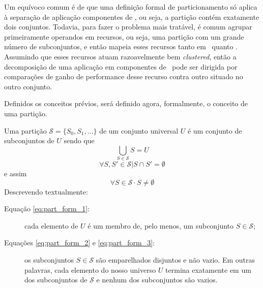          Um equívoco comum é de que uma definição formal de particionamento só aplica à separação de aplicação componentes de \hs, ou seja, a partição contém exatamente dois conjuntos.
         Todavia, para fazer o problema mais tratável, é comum agrupar primeiramente operandos em recursos, ou seja, uma partição com um grande número de subconjuntos, e então mapeia esses recursos tanto em \hardware\ quanto \software.
         Assumindo que esses recursos atuam razoavelmente bem \textit{clustered}, então a decomposição de uma aplicação em componentes de \hs\ pode ser dirigida por comparações de ganho de performance desse recurso contra outro situado no outro conjunto.

         Definidos os conceitos prévios, será definido agora, formalmente, o conceito de uma partição.

         Uma partição $ \mathcal{S} = \{S_0, S_1, \dots\} $ de um conjunto universal $ U $ é um conjunto de subconjuntos de $ U $ sendo que
         \begin{equation}
            \bigcup_{S \in \mathcal{S}} S = U \label{eq:part_form_1}
         \end{equation}
         \begin{equation}
            \forall S, S' \in \mathcal{S} | S \cap S' = \emptyset \label{eq:part_form_2}
         \end{equation}
         e assim
         \begin{equation}
            \forall S \in \mathcal{S} \cdot S \neq \emptyset \label{eq:part_form_3}
         \end{equation}
         Descrevendo textualmente:
         \begin{description}
            \item [Equação \ref{eq:part_form_1}:] cada elemento de $ U $ é um membro de, pelo menos, um subconjunto $ S \in \mathcal{S} $;        

            \item [Equações \ref{eq:part_form_2} e \ref{eq:part_form_3}:] os subconjuntos $ S \in \mathcal{S} $ são emparelhados disjuntos e não vazio.
            Em outras palavras, cada elemento do nosso universo $ U $ termina exatamente em um dos subconjuntos de $\mathcal{S}$ e nenhum dos subconjuntos são vazios.

         \end{description}

